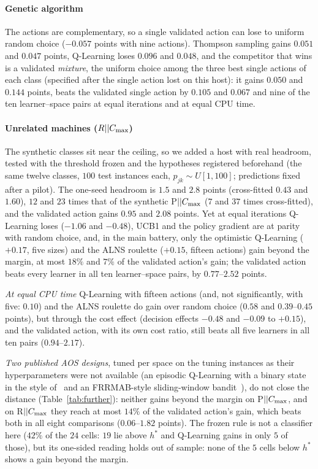 \paragraph{Genetic algorithm} The actions are complementary, so a single validated action can lose to uniform random choice ($-0.057$ points with nine actions). Thompson sampling gains $0.051$ and $0.047$ points, Q-Learning loses $0.096$ and $0.048$, and the competitor that wins is a validated \emph{mixture}, the uniform choice among the three best single actions of each class (specified after the single action lost on this host): it gains $0.050$ and $0.144$ points, beats the validated single action by $0.105$ and $0.067$ and nine of the ten learner--space pairs at equal iterations and at equal CPU time.

\paragraph{Unrelated machines ($R||C_{\max}$)} The synthetic classes sit near the ceiling, so we added a host with real headroom, tested with the threshold frozen and the hypotheses registered beforehand (the same twelve classes, $100$ test instances each, $p_{jk}\sim U[1,100]$; predictions fixed after a pilot). The one-seed headroom is $1.5$ and $2.8$ points (cross-fitted $0.43$ and $1.60$), $12$ and $23$ times that of the synthetic P$||C_{\max}$ ($7$ and $37$ times cross-fitted), and the validated action gains $0.95$ and $2.08$ points. Yet at equal iterations Q-Learning loses ($-1.06$ and $-0.48$), UCB1 and the policy gradient are at parity with random choice, and, in the main battery, only the optimistic Q-Learning ($+0.17$, five sizes) and the ALNS roulette ($+0.15$, fifteen actions) gain beyond the margin, at most $18\%$ and $7\%$ of the validated action's gain; the validated action beats every learner in all ten learner--space pairs, by $0.77$--$2.52$ points.

\emph{At equal CPU time} Q-Learning with fifteen actions (and, not significantly, with five: $0.10$) and the ALNS roulette do gain over random choice ($0.58$ and $0.39$--$0.45$ points), but through the cost effect (decision effects $-0.48$ and $-0.09$ to $+0.15$), and the validated action, with its own cost ratio, still beats all five learners in all ten pairs ($0.94$--$2.17$).

\emph{Two published AOS designs}, tuned per space on the tuning instances as their hyperparameters were not available (an episodic Q-Learning with a binary state in the style of~\cite{KarimiMamaghanEtal2023} and an FRRMAB-style sliding-window bandit~\cite{LiFialhoEtal2014}), do not close the distance (Table~\ref{tab:further}): neither gains beyond the margin on P$||C_{\max}$, and on R$||C_{\max}$ they reach at most $14\%$ of the validated action's gain, which beats both in all eight comparisons ($0.06$--$1.82$ points). The frozen rule is not a classifier here ($42\%$ of the $24$ cells: $19$ lie above $h^*$ and Q-Learning gains in only $5$ of those), but its one-sided reading holds out of sample: none of the $5$ cells below $h^*$ shows a gain beyond the margin.






